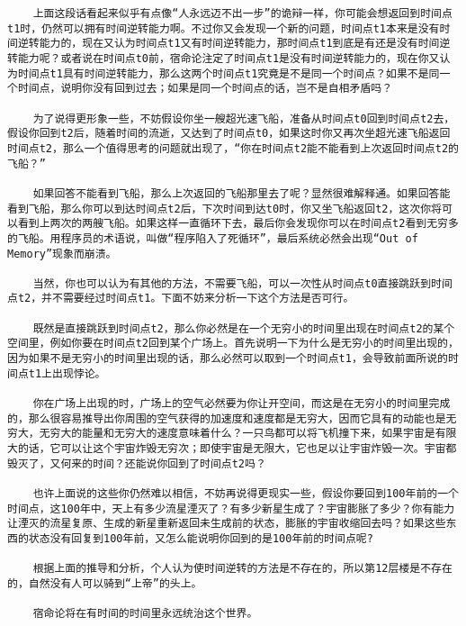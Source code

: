 \begin{verbatim}
    上面这段话看起来似乎有点像“人永远迈不出一步”的诡辩一样，你可能会想返回到时间点t1时，仍然可以拥有时间逆转能力啊。不过你又会发现一个新的问题，时间点t1本来是没有时间逆转能力的，现在又认为时间点t1又有时间逆转能力，那时间点t1到底是有还是没有时间逆转能力呢？或者说在时间点t0前，宿命论注定了时间点t1是没有时间逆转能力的，现在你又认为时间点t1具有时间逆转能力，那么这两个时间点t1究竟是不是同一个时间点？如果不是同一个时间点，说明你没有回到过去；如果是同一个时间点的话，岂不是自相矛盾吗？

    为了说得更形象一些，不妨假设你坐一艘超光速飞船，准备从时间点t0回到时间点t2去，假设你回到t2后，随着时间的流逝，又达到了时间点t0，如果这时你又再次坐超光速飞船返回时间点t2，那么一个值得思考的问题就出现了，“你在时间点t2能不能看到上次返回时间点t2的飞船？”

    如果回答不能看到飞船，那么上次返回的飞船那里去了呢？显然很难解释通。如果回答能看到飞船，那么你可以到达时间点t2后，下次时间到达t0时，你又坐飞船返回t2，这次你将可以看到上两次的两艘飞船。如果这样一直循环下去，最后你会发现你可以在时间点t2看到无穷多的飞船。用程序员的术语说，叫做“程序陷入了死循环”，最后系统必然会出现“Out of Memory”现象而崩溃。

    当然，你也可以认为有其他的方法，不需要飞船，可以一次性从时间点t0直接跳跃到时间点t2，并不需要经过时间点t1。下面不妨来分析一下这个方法是否可行。

    既然是直接跳跃到时间点t2，那么你必然是在一个无穷小的时间里出现在时间点t2的某个空间里，例如你要在时间点t2回到某个广场上。首先说明一下为什么是无穷小的时间里出现的，因为如果不是无穷小的时间里出现的话，那么必然可以取到一个时间点t1，会导致前面所说的时间点t1上出现悖论。

    你在广场上出现的时，广场上的空气必然要为你让开空间，而这是在无穷小的时间里完成的，那么很容易推导出你周围的空气获得的加速度和速度都是无穷大，因而它具有的动能也是无穷大，无穷大的能量和无穷大的速度意味着什么？一只鸟都可以将飞机撞下来，如果宇宙是有限大的话，它可以让这个宇宙炸毁无穷次；即使宇宙是无限大，它也足以让宇宙炸毁一次。宇宙都毁灭了，又何来的时间？还能说你回到了时间点t2吗？

    也许上面说的这些你仍然难以相信，不妨再说得更现实一些，假设你要回到100年前的一个时间点，这100年中，天上有多少流星湮灭了？有多少新星生成了？宇宙膨胀了多少？你有能力让湮灭的流星复原、生成的新星重新返回未生成前的状态，膨胀的宇宙收缩回去吗？如果这些东西的状态没有回复到100年前，又怎么能说明你回到的是100年前的时间点呢?

    根据上面的推导和分析，个人认为使时间逆转的方法是不存在的，所以第12层楼是不存在的，自然没有人可以骑到“上帝”的头上。

    宿命论将在有时间的时间里永远统治这个世界。
\end{verbatim}
